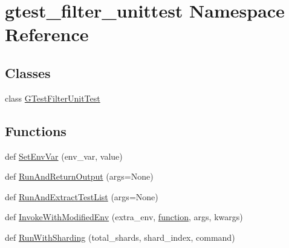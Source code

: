 \hypertarget{namespacegtest__filter__unittest}{}\section{gtest\+\_\+filter\+\_\+unittest Namespace Reference}
\label{namespacegtest__filter__unittest}
\subsection*{Classes}
\begin{DoxyCompactItemize}
\item 
class \hyperlink{classgtest__filter__unittest_1_1_g_test_filter_unit_test}{G\+Test\+Filter\+Unit\+Test}
\end{DoxyCompactItemize}
\subsection*{Functions}
\begin{DoxyCompactItemize}
\item 
def \hyperlink{namespacegtest__filter__unittest_a8ba027a73134bf97696651252457b492}{Set\+Env\+Var} (env\+\_\+var, value)
\item 
def \hyperlink{namespacegtest__filter__unittest_abb83ed30067e0d13161fd89868ed476b}{Run\+And\+Return\+Output} (args=None)
\item 
def \hyperlink{namespacegtest__filter__unittest_aaf6916ce9c936a238afeb79a4d326a12}{Run\+And\+Extract\+Test\+List} (args=None)
\item 
def \hyperlink{namespacegtest__filter__unittest_a2bfd6ae10e7002148bc25e505bd61534}{Invoke\+With\+Modified\+Env} (extra\+\_\+env, \hyperlink{_07copy_08_2_undistort_image_8m_aa0b19300b507d475ab9f1525750bc11f}{function}, args, kwargs)
\item 
def \hyperlink{namespacegtest__filter__unittest_a4d88cc7e4faf5305640a66dc487b33fb}{Run\+With\+Sharding} (total\+\_\+shards, shard\+\_\+index, command)
\end{DoxyCompactItemize}
